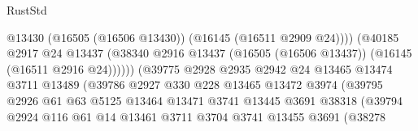 \begin{lexlean}{RustStd}
\begin{coremodule}
                                              @13430
                                              (@16505 (@16506 @13430))
                                              (@16145 (@16511 @2909 @24))))
                                          (@40185
                                            @2917
                                            @24
                                            @13437
                                            (@38340
                                              @2916
                                              @13437
                                              (@16505 (@16506 @13437))
                                              (@16145 (@16511 @2916 @24))))))
                                      (@39775
                                        @2928
                                        @2935
                                        @2942
                                        @24
                                        @13465
                                        @13474
                                        @3711
                                        @13489
                                        (@39786
                                          @2927
                                          @330
                                          @228
                                          @13465
                                          @13472
                                          @3974
                                          (@39795
                                            @2926
                                            @61
                                            @63
                                            @5125
                                            @13464
                                            @13471
                                            @3741
                                            @13445
                                            @3691
                                            @38318
                                            (@39794
                                              @2924
                                              @116
                                              @61
                                              @14
                                              @13461
                                              @3711
                                              @3704
                                              @3741
                                              @13455
                                              @3691
                                              (@38278

\end{coremodule}
\end{lexlean}
